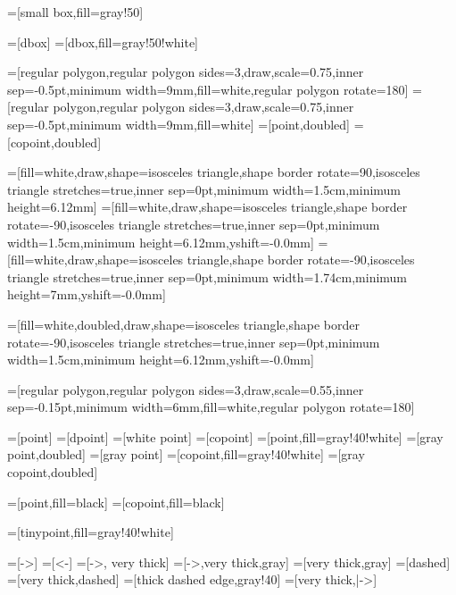=[small box,fill=gray!50]

=[dbox]
=[dbox,fill=gray!50!white]

=[regular polygon,regular polygon sides=3,draw,scale=0.75,inner sep=-0.5pt,minimum width=9mm,fill=white,regular polygon rotate=180]
=[regular polygon,regular polygon sides=3,draw,scale=0.75,inner sep=-0.5pt,minimum width=9mm,fill=white]
=[point,doubled]
=[copoint,doubled]

=[fill=white,draw,shape=isosceles triangle,shape border rotate=90,isosceles triangle stretches=true,inner sep=0pt,minimum width=1.5cm,minimum height=6.12mm]
=[fill=white,draw,shape=isosceles triangle,shape border rotate=-90,isosceles triangle stretches=true,inner sep=0pt,minimum width=1.5cm,minimum height=6.12mm,yshift=-0.0mm]
=[fill=white,draw,shape=isosceles triangle,shape border rotate=-90,isosceles triangle stretches=true,inner sep=0pt,minimum width=1.74cm,minimum height=7mm,yshift=-0.0mm]

=[fill=white,doubled,draw,shape=isosceles triangle,shape border rotate=-90,isosceles triangle stretches=true,inner sep=0pt,minimum width=1.5cm,minimum height=6.12mm,yshift=-0.0mm]

=[regular polygon,regular polygon sides=3,draw,scale=0.55,inner sep=-0.15pt,minimum width=6mm,fill=white,regular polygon rotate=180] 

=[point]
=[dpoint]
=[white point] %
=[copoint]
=[point,fill=gray!40!white]
=[gray point,doubled]
=[gray point] %
=[copoint,fill=gray!40!white]
=[gray copoint,doubled]

=[point,fill=black]
=[copoint,fill=black]

=[tinypoint,fill=gray!40!white]

=[->]
=[<-]
=[->, very thick]
=[->,very thick,gray]
=[very thick,gray]
=[dashed]
=[very thick,dashed]
=[thick dashed edge,gray!40]
=[very thick,|->]

